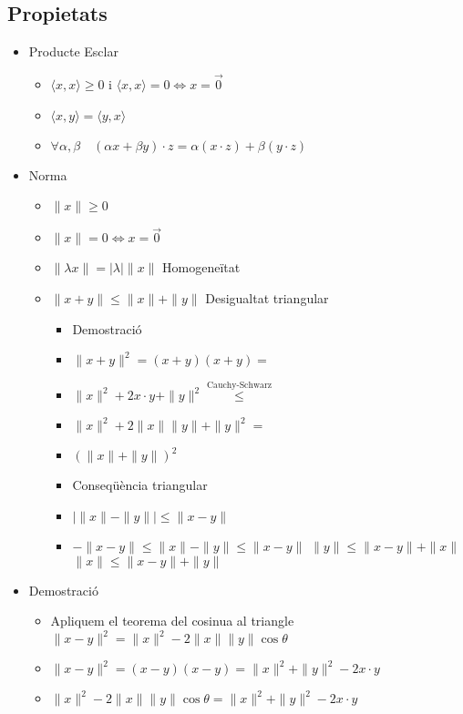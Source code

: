 \documentclass{article}
\newcommand{\prodEscalar}[2]{\langle#1, #2\rangle}
\begin{document}
\subsection*{Propietats}
\begin{itemize}
\item Producte Esclar
	\begin{itemize}
	\item $\prodEscalar{x}{x} \ge 0$ i $\prodEscalar{x}{x} = 0 \Leftrightarrow x = \vec0$
	\item $\prodEscalar{x}{y} = \prodEscalar{y}{x}$
	\item $\forall \alpha, \beta\quad (\alpha x + \beta y)\cdot z = \alpha(x\cdot z) + \beta(y\cdot z)$
	\end{itemize}
\item Norma
	\begin{itemize}
	\item $\|x\| \ge 0$
	\item $\|x\| = 0 \Leftrightarrow x = \vec 0$
	\item $\|\lambda x\| = |\lambda|\|x\|$ Homogeneïtat
	\item $\|x + y\| \le \|x\| + \|y\|$ Desigualtat triangular
		\begin{itemize}
		\item Demostració
		\item $\|x + y\|^2 = (x + y)(x + y) =$
		\item $\|x\|^2 + 2x\cdot y + \|y\|^2 \overset{\text{Cauchy-Schwarz}}{\le}$
		\item $\|x\|^2 + 2\|x\|\|y\| + \|y\|^2 = $
		\item $(\|x\| + \|y\|)^2$
		\item Conseqüència triangular
		\item $|\|x\|-\|y\|| \le \|x - y\|$
		\item $-\|x-y\| \le \|x\| - \|y\| \le \|x - y\|$
			\subitem $\|y\| \le \|x - y\| + \|x\|$
			\subitem $\|x\| \le \|x - y\| + \|y\|$
		\end{itemize}
	\end{itemize}
\item Demostració
	\begin{itemize}
	\item Apliquem el teorema del cosinua al triangle
	\subitem $\|x-y\|^2 = \|x\|^2 - 2 \|x\|\|y\| \cos{\theta}$
	\item $\|x-y\|^2 = (x - y) (x - y) = \|x\|^2 + \|y\|^2 - 2x\cdot y$
	\item $\|x\|^2 - 2 \|x\|\|y\| \cos{\theta} = \|x\|^2 + \|y\|^2 - 2x\cdot y$
	\end{itemize}
\end{itemize}
\end{document}
